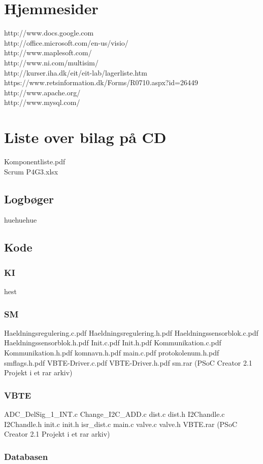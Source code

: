 \section{Hjemmesider}
http://www.docs.google.com\\
http://office.microsoft.com/en-us/visio/\\
http://www.maplesoft.com/\\
http://www.ni.com/multisim/\\
http://kurser.iha.dk/eit/eit-lab/lagerliste.htm\\
https://www.retsinformation.dk/Forms/R0710.aspx?id=26449\\
http://www.apache.org/\\
http://www.mysql.com/\\

\section{Liste over bilag på CD}
Komponentliste.pdf\\
Scrum P4G3.xlsx\\
\subsection{Logbøger}
huehuehue
\subsection{Kode}
\subsubsection{KI}
hest
\subsubsection{SM}
Haeldningsregulering.c.pdf
Haeldningsregulering.h.pdf
Haeldningssensorblok.c.pdf
Haeldningssensorblok.h.pdf
Init.c.pdf
Init.h.pdf
Kommunikation.c.pdf
Kommunikation.h.pdf
komnavn.h.pdf
main.c.pdf
protokolenum.h.pdf
smflags.h.pdf
VBTE-Driver.c.pdf
VBTE-Driver.h.pdf
sm.rar (PSoC Creator 2.1 Projekt i et rar arkiv)
\subsubsection{VBTE}
ADC_DelSig_1_INT.c
Change_I2C_ADD.c
dist.c
dist.h
I2Chandle.c
I2Chandle.h
init.c
init.h
isr_dist.c
main.c
valve.c
valve.h
VBTE.rar (PSoC Creator 2.1 Projekt i et rar arkiv)
\subsubsection{Databasen}
